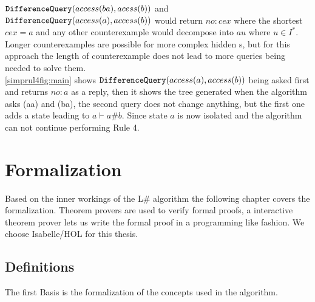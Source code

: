 $\textnormal{\texttt{DifferenceQuery}}(access(ba),acess(b))$ and \newline$\textnormal{\texttt{DifferenceQuery}}(access(a),access(b))$ would return $no:cex$ where the shortest $cex=a$ and any other counterexample would decompose into $au$ where $u\in I^*$. Longer counterexamples are possible for more complex hidden s, but for this approach the length of counterexample does not lead to more queries being needed to solve them. \\
\autoref{simprul4fig:main} shows $\textnormal{\texttt{DifferenceQuery}}(access(a),access(b))$ being asked first and returns $no:a$ as a reply, then it shows the tree generated when the algorithm asks \oquery(aa) and \oquery(ba), the second query does not change anything, but the first one adds a state leading to $a\vdash a\#b$. Since state $a$ is now isolated and the algorithm can not continue performing Rule 4.


\chapter{Formalization}\label{chap:three}
Based on the inner workings of the L$\#$ algorithm the following chapter covers the formalization. Theorem provers are used to verify formal proofs, a interactive theorem prover lets us write the formal proof in a programming like fashion. We choose Isabelle/HOL for this thesis.
\section{Definitions}
The first Basis is the formalization of the concepts used in the algorithm. 
